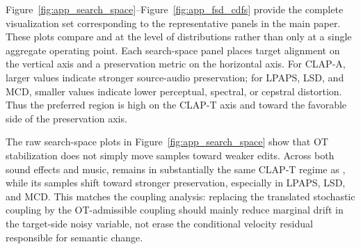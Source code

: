 Figure~\ref{fig:app_search_space}--Figure~\ref{fig:app_fsd_cdfs} provide the complete visualization set corresponding to the representative panels in the main paper.
These plots compare \method and \methodplus at the level of distributions rather than only at a single aggregate operating point.
Each search-space panel places target alignment on the vertical axis and a preservation metric on the horizontal axis.
For CLAP-A, larger values indicate stronger source-audio preservation; for LPAPS, LSD, and MCD, smaller values indicate lower perceptual, spectral, or cepstral distortion.
Thus the preferred region is high on the CLAP-T axis and toward the favorable side of the preservation axis.

The raw search-space plots in Figure~\ref{fig:app_search_space} show that OT stabilization does not simply move samples toward weaker edits.
Across both sound effects and music, \methodplus remains in substantially the same CLAP-T regime as \method, while its samples shift toward stronger preservation, especially in LPAPS, LSD, and MCD.
This matches the coupling analysis: replacing the translated stochastic coupling by the OT-admissible coupling should mainly reduce marginal drift in the target-side noisy variable, not erase the conditional velocity residual responsible for semantic change.

